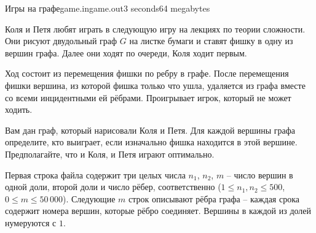 \begin{problem}{Игры на графе}{game.in}{game.out}{3 seconds}{64 megabytes}


Коля и Петя любят играть в следующую игру на лекциях по теории сложности.
Они рисуют двудольный граф $G$ на листке бумаги и ставят фишку в одну из вершин графа.
Далее они ходят по очереди, Коля ходит первым.

Ход состоит из перемещения фишки по ребру в графе.
После перемещения фишки вершина, из которой фишка только что ушла, удаляется из графа вместе со всеми инцидентными ей рёбрами.
Проигрывает игрок, который не может ходить.

Вам дан граф, который нарисовали Коля и Петя.
Для каждой вершины графа определите, кто выиграет, если изначально фишка находится в этой вершине.
Предполагайте, что и Коля, и Петя играют оптимально.

\InputFile

Первая строка файла содержит три целых числа $n_1$, $n_2$, $m$ -- число вершин в одной доли, второй доли и число рёбер, соответственно
($1 \le n_1, n_2 \le 500$, $0 \le m \le 50\,000$).
Следующие $m$ строк описывают рёбра графа -- каждая срока содержит номера вершин, которые рёбро соединяет.
Вершины в каждой из долей нумеруются с $1$.

\OutputFile


\end{problem}

